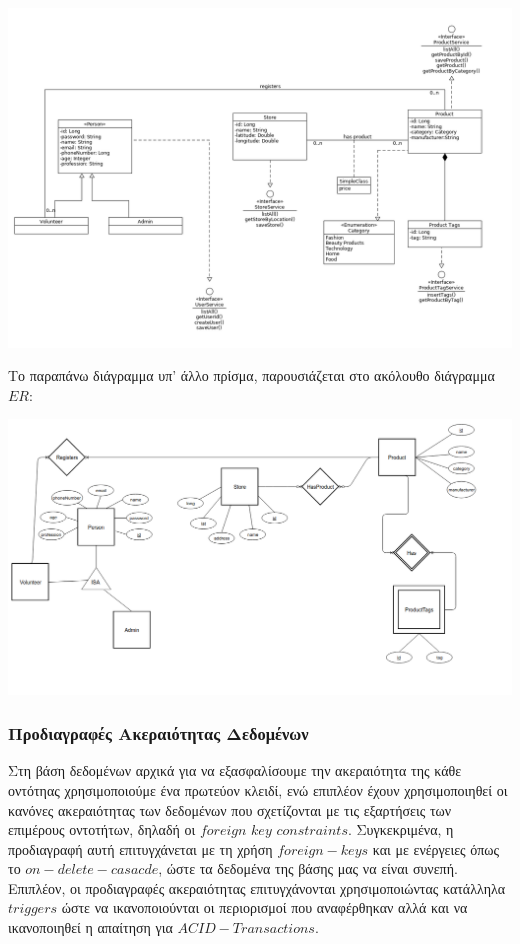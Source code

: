 \documentclass[12pt]{article}
\begin{document}
\begin{center}
\includegraphics[scale=0.35]{UML/classDiagram.png}
\end{center}

Το παραπάνω διάγραμμα υπ' άλλο πρίσμα, παρουσιάζεται στο ακόλουθο διάγραμμα $ER$:

\begin{center}
\includegraphics[scale=0.35]{UML/ER-Diagram.png}
\end{center}


\subsubsection{Προδιαγραφές Ακεραιότητας Δεδομένων}

Στη βάση δεδομένων αρχικά για να εξασφαλίσουμε την ακεραιότητα της κάθε οντότηας χρησιμοποιούμε ένα πρωτεύον κλειδί, ενώ επιπλέον έχουν χρησιμοποιηθεί οι κανόνες ακεραιότητας των δεδομένων που σχετίζονται με τις εξαρτήσεις των επιμέρους οντοτήτων, δηλαδή οι $foreign$ $key$ $constraints$. Συγκεκριμένα, η προδιαγραφή αυτή επιτυγχάνεται με τη χρήση $foreign-keys$ και με ενέργειες όπως το $on-delete-casacde$, ώστε τα δεδομένα της βάσης μας να είναι συνεπή. Επιπλέον, οι προδιαγραφές ακεραιότητας επιτυγχάνονται χρησιμοποιώντας κατάλληλα $triggers$ ώστε να ικανοποιούνται οι περιορισμοί που αναφέρθηκαν αλλά και να ικανοποιηθεί η απαίτηση για $ACID-Transactions$. 
\end{document}
